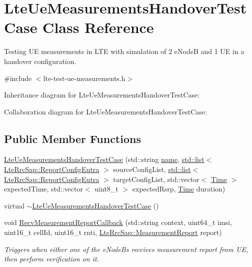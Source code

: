 \hypertarget{classLteUeMeasurementsHandoverTestCase}{}\section{Lte\+Ue\+Measurements\+Handover\+Test\+Case Class Reference}
\label{classLteUeMeasurementsHandoverTestCase}


Testing UE measurements in L\+TE with simulation of 2 e\+NodeB and 1 UE in a handover configuration.  




{\ttfamily \#include $<$lte-\/test-\/ue-\/measurements.\+h$>$}



Inheritance diagram for Lte\+Ue\+Measurements\+Handover\+Test\+Case\+:


Collaboration diagram for Lte\+Ue\+Measurements\+Handover\+Test\+Case\+:
\subsection*{Public Member Functions}
\begin{DoxyCompactItemize}
\item 
\hyperlink{classLteUeMeasurementsHandoverTestCase_a784b15d74295261bb3ea0b79aa3b12e5}{Lte\+Ue\+Measurements\+Handover\+Test\+Case} (std\+::string \hyperlink{generate__test__data__lte__spectrum__model_8m_ab74e6bf80237ddc4109968cedc58c151}{name}, \hyperlink{openflow-interface_8h_afd9bcfa176617760671b67580f536fa7}{std\+::list}$<$ \hyperlink{structns3_1_1LteRrcSap_1_1ReportConfigEutra}{Lte\+Rrc\+Sap\+::\+Report\+Config\+Eutra} $>$ source\+Config\+List, \hyperlink{openflow-interface_8h_afd9bcfa176617760671b67580f536fa7}{std\+::list}$<$ \hyperlink{structns3_1_1LteRrcSap_1_1ReportConfigEutra}{Lte\+Rrc\+Sap\+::\+Report\+Config\+Eutra} $>$ target\+Config\+List, std\+::vector$<$ \hyperlink{classns3_1_1Time}{Time} $>$ expected\+Time, std\+::vector$<$ uint8\+\_\+t $>$ expected\+Rsrp, \hyperlink{classns3_1_1Time}{Time} duration)
\item 
virtual \hyperlink{classLteUeMeasurementsHandoverTestCase_a61747abb493dc70bcea3652b9b384fe6}{$\sim$\+Lte\+Ue\+Measurements\+Handover\+Test\+Case} ()
\item 
void \hyperlink{classLteUeMeasurementsHandoverTestCase_a84e6c207fcc76d63315df0b84660a9b5}{Recv\+Measurement\+Report\+Callback} (std\+::string context, uint64\+\_\+t imsi, uint16\+\_\+t cell\+Id, uint16\+\_\+t rnti, \hyperlink{structns3_1_1LteRrcSap_1_1MeasurementReport}{Lte\+Rrc\+Sap\+::\+Measurement\+Report} report)
\begin{DoxyCompactList}\small\item\em Triggers when either one of the e\+Node\+Bs receives measurement report from UE, then perform verification on it. \end{DoxyCompactList}\end{DoxyCompactItemize}
